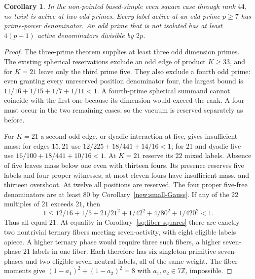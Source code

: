 \documentclass[11pt]{amsart}
\numberwithin{equation}{section}
\newtheorem{corollary}[theorem]{Corollary}
\theoremstyle{definition}
\theoremstyle{plain}
\newcommand{\ZZ}{\mathbb Z}
\begin{document}
\begin{corollary}\label{cor:odd-isolation}
In the non-pointed based-simple even square case through rank $44$,
no twist is active at two odd primes. Every label active at an odd
prime $p\ge7$ has prime-power denominator. An odd prime that is not
isolated has at least $4(p-1)$ active denominators divisible by $2p$.
\end{corollary}
\begin{proof}
The three-prime theorem supplies at least three odd dimension primes.
The existing spherical reservations exclude an odd edge of product
$K\ge33$, and for $K=21$ leave only the third prime five. They also
exclude a fourth odd prime: even granting every unreserved position
denominator four, the largest bound is
$11/16+1/15+1/7+1/11<1$. A fourth-prime spherical summand cannot
coincide with the first one because its dimension would exceed the
rank. A four must occur in the two remaining cases, so the vacuum
is reserved separately as before.

For $K=21$ a second odd edge, or dyadic interaction at five, gives
insufficient mass: for edges $15,21$ use $12/225+18/441+14/16<1$;
for $21$ and dyadic five use $16/100+18/441+10/16<1$.
At $K=21$ reserve its $22$ mixed labels.
Absence of five leaves mass below one even with thirteen fours.
Its presence reserves five labels and four proper witnesses; at
most eleven fours have insufficient mass, and thirteen overshoot.
At twelve all positions are reserved. The four proper five-free
denominators are at least $80$ by Corollary~\ref{new:small-Gauss}.
If any of the $22$ multiples of $21$ exceeds $21$, then
\[
 1\le12/16+1/5+21/21^2+1/42^2+4/80^2+1/420^2<1.
\]
Thus all equal $21$. At equality in Corollary~\ref{sq:fiber-squares}
there are exactly two nontrivial ternary fibers meeting seven-activity,
with eight eligible labels apiece. A higher ternary phase would require
three such fibers, a higher seven-phase $21$ labels in one fiber.
Each therefore has six singleton primitive seven-phases and two eligible
seven-neutral labels, all of the same weight. The fiber moments give
$(1-a_1)^2+(1-a_2)^2=8$ with $a_1,a_2\in7\ZZ$, impossible.


\end{proof}
\end{document}

